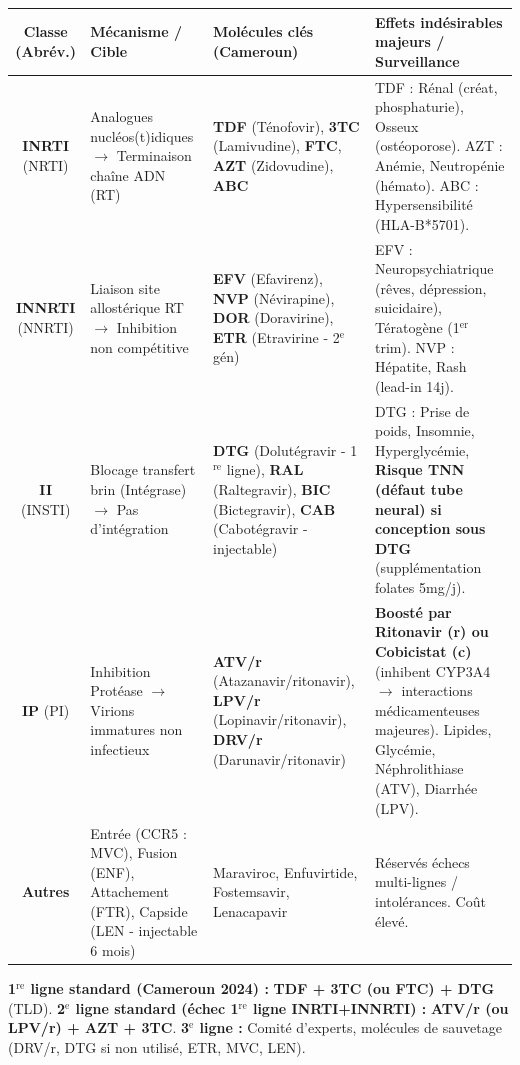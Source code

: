 \documentclass[11pt]{article}
\begin{document}
\begin{definition}
\begin{center}
\begin{tabular}{|c|l|l|l|}\hline
\textbf{Classe (Abrév.)} & \textbf{Mécanisme / Cible} & \textbf{Molécules clés (Cameroun)} & \textbf{Effets indésirables majeurs / Surveillance} \\ \hline
\textbf{INRTI} (NRTI) & Analogues nucléos(t)idiques $\rightarrow$ Terminaison chaîne ADN (RT) & \textbf{TDF} (Ténofovir), \textbf{3TC} (Lamivudine), \textbf{FTC}, \textbf{AZT} (Zidovudine), \textbf{ABC} & TDF : Rénal (créat, phosphaturie), Osseux (ostéoporose). AZT : Anémie, Neutropénie (hémato). ABC : Hypersensibilité (HLA-B*5701). \\ \hline
\textbf{INNRTI} (NNRTI) & Liaison site allostérique RT $\rightarrow$ Inhibition non compétitive & \textbf{EFV} (Efavirenz), \textbf{NVP} (Névirapine), \textbf{DOR} (Doravirine), \textbf{ETR} (Etravirine - 2$^{\text{e}}$ gén) & EFV : Neuropsychiatrique (rêves, dépression, suicidaire), Tératogène (1$^{\text{er}}$ trim). NVP : Hépatite, Rash (lead-in 14j). \\ \hline
\textbf{II} (INSTI) & Blocage transfert brin (Intégrase) $\rightarrow$ Pas d'intégration & \textbf{DTG} (Dolutégravir - 1$^{\text{re}}$ ligne), \textbf{RAL} (Raltegravir), \textbf{BIC} (Bictegravir), \textbf{CAB} (Cabotégravir - injectable) & DTG : Prise de poids, Insomnie, Hyperglycémie, \textbf{Risque TNN (défaut tube neural) si conception sous DTG} (supplémentation folates 5mg/j). \\ \hline
\textbf{IP} (PI) & Inhibition Protéase $\rightarrow$ Virions immatures non infectieux & \textbf{ATV/r} (Atazanavir/ritonavir), \textbf{LPV/r} (Lopinavir/ritonavir), \textbf{DRV/r} (Darunavir/ritonavir) & \textbf{Boosté par Ritonavir (r) ou Cobicistat (c)} (inhibent CYP3A4 $\rightarrow$ interactions médicamenteuses majeures). Lipides, Glycémie, Néphrolithiase (ATV), Diarrhée (LPV). \\ \hline
\textbf{Autres} & Entrée (CCR5 : MVC), Fusion (ENF), Attachement (FTR), Capside (LEN - injectable 6 mois) & Maraviroc, Enfuvirtide, Fostemsavir, Lenacapavir & Réservés échecs multi-lignes / intolérances. Coût élevé. \\ \hline
\end{tabular}
\end{center}
\textbf{1$^{\text{re}}$ ligne standard (Cameroun 2024) :} \textbf{TDF + 3TC (ou FTC) + DTG} (TLD). \textbf{2$^{\text{e}}$ ligne standard (échec 1$^{\text{re}}$ ligne INRTI+INNRTI) :} \textbf{ATV/r (ou LPV/r) + AZT + 3TC}. \textbf{3$^{\text{e}}$ ligne :} Comité d'experts, molécules de sauvetage (DRV/r, DTG si non utilisé, ETR, MVC, LEN).
\end{definition}
\end{document}
